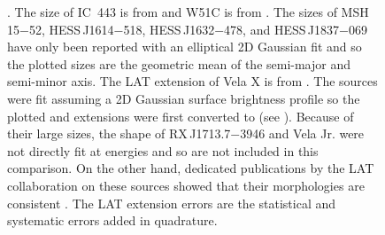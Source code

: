 \begin{figure}
{    \cite{aharonian_2005a_discovery-extended,aharonian_2006_energy-dependent,aharonian_2006a_first-detection,aharonian_2007a_h.e.s.s.-observations,aharonian_2007a_primary-particle,aharonian_2008a_discovery-energy}.
    The \tev size of IC~443 is from \cite{acciari_2009a_observation-extended} and
    W51C is from \cite{krause_2011a_probing-proton}.  The \tev
    sizes of MSH\,15$-$52, HESS\,J1614$-$518, HESS\,J1632$-$478, and
    HESS\,J1837$-$069 have only been reported with an elliptical 2D
    Gaussian fit and so the plotted sizes are the geometric 
    mean of the semi-major and semi-minor axis.
    The LAT extension of
    Vela X is from \cite{abdo_2010c_fermi-large}. 
    The \tev sources were fit assuming a 2D Gaussian surface brightness profile
    so the plotted \gev and \tev extensions were first converted to
    \rsixeight (see ).  
    Because of
    their large sizes, the shape of RX\,J1713.7$-$3946 and Vela Jr.
    were not directly fit at \tev energies and so are not included
    in this comparison. On the other hand, dedicated publications by the 
    LAT collaboration on
    these sources showed that their morphologies are consistent
    \citep{abdo_2011a_observations-young,tanaka_2011a_gamma-ray-observations}.
    The LAT
    extension errors are the statistical and systematic errors added
    in quadrature. 
}
  \end{figure}

